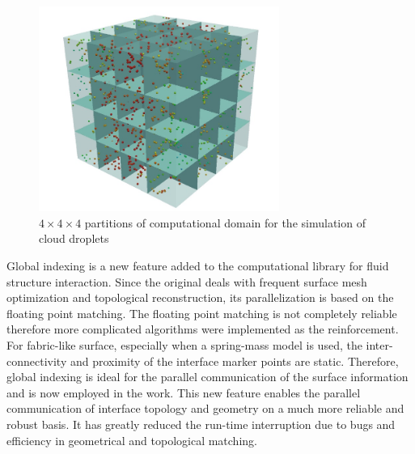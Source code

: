 \begin{figure}[!htbp] \centering
\includegraphics[width=0.7\textwidth]{Figures/droplets_parallel.jpg}
\caption{$4\times 4\times 4$ partitions of computational domain for the simulation of 
cloud droplets\label{fig:droplets_parallel}} 
\end{figure}

Global indexing is a new feature added to the \FronTierp computational library
for fluid structure interaction.  Since the original \FronTierp
\cite{DuFixGli05} deals with frequent surface mesh optimization and topological
reconstruction, its parallelization is based on the floating point matching.
The floating point matching is not completely reliable therefore more
complicated algorithms were implemented as the reinforcement.  For fabric-like
surface, especially when a spring-mass model is used, the inter-connectivity and
proximity of the interface marker points are static. Therefore, global indexing
is ideal for the parallel communication of the surface information and is now
employed in the work.  This new feature enables the parallel communication of
interface topology and geometry on a much more reliable and robust basis. It has
greatly reduced the run-time interruption due to bugs and efficiency in
geometrical and topological matching.

